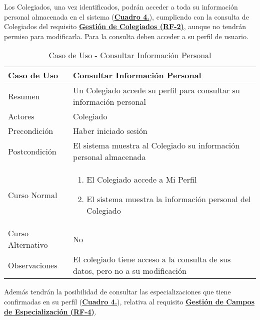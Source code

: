 \addtocounter{tabla}{1}
Los Colegiados, una vez identificados, podrán acceder a toda su información personal almacenada en el sistema (\textbf{\hyperref[tab:cucConsultaInfoPersonal]{Cuadro 4.}}), cumpliendo con la consulta de Colegiados del requisito \textbf{\hyperref[tab:rfGestColeg]{Gestión de Colegiados (RF-2)}}, aunque no tendrán permiso para modificarla. Para la consulta deben acceder a su perfil de usuario.

\begin{table}[!htbp]
  \centering  \addtocounter{casouso}{1}
  \begin{tabular}{|l | p{100mm}|}
    \textbf{Caso de Uso}  & \textbf{Consultar Información Personal} \\ \hline
    Resumen 		 & Un Colegiado accede su perfil para consultar su información personal \\ \hline
    Actores  		 & Colegiado \\ \hline
    Precondición  	 & Haber iniciado sesión \\ \hline
    Postcondición  	 & El sistema muestra al Colegiado su información personal almacenada \\ \hline
    Curso Normal   	 & \begin{enumerate}
	  \item El Colegiado accede a Mi Perfil
	  \item El sistema muestra la información personal del Colegiado
    \end{enumerate}  \\ \hline
    Curso Alternativo  & No  \\ \hline
    Observaciones 	 & El colegiado tiene acceso a la consulta de sus datos, pero no a su modificación \\ \hline
  \end{tabular}
  \caption{Caso de Uso  - Consultar Información Personal}
  \label{tab:cucConsultaInfoPersonal}
\end{table}
\FloatBarrier

\addtocounter{tabla}{1}
Además tendrán la posibilidad de consultar las especializaciones que tiene confirmadas en su perfil (\textbf{\hyperref[tab:cucConsultaEspec]{Cuadro 4.}}), relativa al requisito \textbf{\hyperref[tab:rfGestEspec]{Gestión de Campos de Especialización (RF-4)}}.

